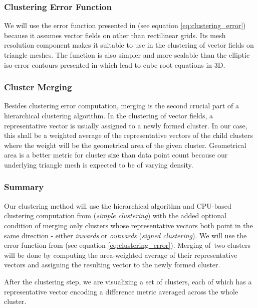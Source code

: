 \subsubsection{Clustering Error Function}

We will use the error function presented in \citet{Peng12} (see equation \ref{eq:clustering_error}) because it assumes vector fields on other than rectilinear grids. Its mesh resolution component makes it suitable to use in the clustering of vector fields on triangle meshes. The function is also simpler and more scalable than the elliptic iso-error contours presented in \citet{Telea99} which lead to cube root equations in 3D.

\subsubsection{Cluster Merging}

Besides clustering error computation, merging is the second crucial part of a hierarchical clustering algorithm. In the clustering of vector fields, a representative vector is usually assigned to a newly formed cluster. In our case, this shall be a weighted average of the representative vectors of the child clusters where the weight will be the geometrical area of the given cluster. Geometrical area is a better metric for cluster size than data point count because our underlying triangle mesh is expected to be of varying density.

\subsubsection{Summary}

Our clustering method will use the hierarchical algorithm and CPU-based clustering computation from \citet{Telea99} ({\it simple clustering}) with the added optional condition of merging only clusters whose representative vectors both point in the same direction - either {\it inwards} or {\it outwards} ({\it signed clustering}). We will use the error function from \citet{Peng12} (see equation \ref{eq:clustering_error}). Merging of~two clusters will be done by computing the area-weighted average of their representative vectors and assigning the resulting vector to the newly formed cluster.

After the clustering step, we are visualizing a set of clusters, each of which has a representative vector encoding a difference metric averaged across the whole cluster.
